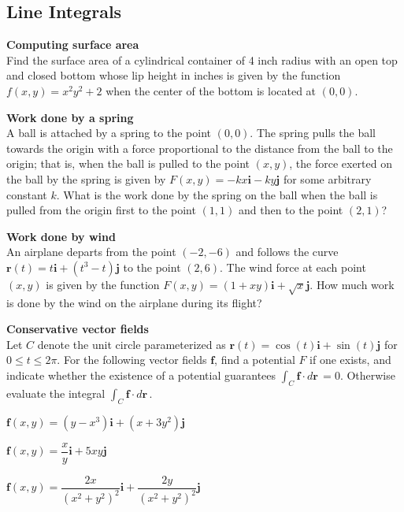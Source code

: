 \subsection{Line Integrals}

\BEN

\item
\textbf{Computing surface area} \\
Find the surface area of a cylindrical container of 4 inch radius with an
open top and closed bottom whose lip height in inches is given by the function
$f(x,y) = x^2y^2 + 2$ when the center of the bottom is located at $(0,0)$.

\item
\textbf{Work done by a spring} \\
A ball is attached by a spring to the point $(0,0)$.  The spring pulls
the ball towards the origin with a force proportional to the distance from the
ball to the origin; that is, when the ball is pulled to the point $(x,y)$, the
force exerted on the ball by the spring is given by $F(x,y) = -kx\mathbf{i} -
ky\mathbf{j}$ for some arbitrary constant $k$.  What is the work done by the
spring on the ball when the ball is pulled from the origin first to the point
$(1,1)$ and then to the point $(2,1)$?

\item
\textbf{Work done by wind} \\
An airplane departs from the point $(-2, -6)$ and follows the curve
$\mathbf{r}(t) = t\mathbf{i} + (t^3 - t)\mathbf{j}$ to the point $(2, 6)$.  The
wind force at each point $(x, y)$ is given by the function $F(x,y) = (1 +
xy)\mathbf{i} + \sqrt{x}\mathbf{j}$.  How much work is done by the wind on the
airplane during its flight?

\item
\textbf{Conservative vector fields} \\
Let $C$ denote the unit circle parameterized as $\mathbf{r}(t) =
\cos(t)\mathbf{i} + \sin(t)\mathbf{j}$ for $0 \leq t \leq 2\pi$.  For the
following vector fields $\mathbf{f}$, find a potential $F$ if one exists, and
indicate whether the existence of a potential guarantees $\int_C \! \mathbf{f}
\cdot d\mathbf{r} \, = 0$.  Otherwise evaluate the integral $\int_C \!
\mathbf{f} \cdot d\mathbf{r} \,$.

\BEN
\item $\mathbf{f}(x,y) = (y - x^3)\mathbf{i} + (x + 3y^2)\mathbf{j}$
\item $\mathbf{f}(x,y) = \dfrac{x}{y}\mathbf{i} + 5xy\mathbf{j}$
\item $\mathbf{f}(x,y) = \dfrac{2x}{(x^2+y^2)^2}\mathbf{i} + \dfrac{2y}{(x^2+y^2)^2}\mathbf{j}$
\EEN

